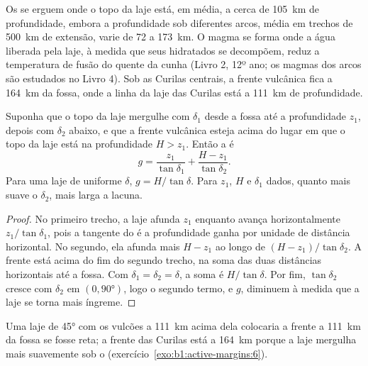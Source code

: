 Os  se erguem onde o topo da laje está, em média, a cerca de \qty{105}{km} de profundidade, embora a profundidade sob diferentes arcos, média em trechos de \qty{500}{km} de extensão, varie de 72 a \qty{173}{km}. O magma se forma onde a água liberada pela laje, à medida que seus  hidratados se decompõem, reduz a temperatura de fusão do  quente da cunha (Livro 2, 12º ano; os magmas dos arcos são estudados no Livro 4). Sob as Curilas centrais, a frente vulcânica fica a \qty{164}{km} da fossa, onde a linha da laje das Curilas está a \qty{111}{km} de profundidade.

\begin{proposition}\label{prop:b1:active-margins:gap}
Suponha que o topo da laje mergulhe com $\delta_1$ desde a fossa até a profundidade $z_1$, depois com $\delta_2$ abaixo, e que a frente vulcânica esteja acima do lugar em que o topo da laje está na profundidade $H > z_1$. Então a  é
\[
  g = \frac{z_1}{\tan\delta_1} + \frac{H - z_1}{\tan\delta_2} .
\]
Para uma laje de  uniforme $\delta$, $g = H/\tan\delta$. Para $z_1$, $H$ e $\delta_1$ dados, quanto mais suave o  $\delta_2$, mais larga a lacuna.
\end{proposition}

\begin{proof}
No primeiro trecho, a laje afunda $z_1$ enquanto avança horizontalmente
$z_1/\tan\delta_1$, pois a tangente do  é a profundidade ganha por unidade de distância horizontal. No segundo, ela afunda mais $H - z_1$ ao longo de
$(H - z_1)/\tan\delta_2$. A frente está acima do fim do segundo trecho, na soma das duas distâncias horizontais até a fossa. Com $\delta_1 = \delta_2
= \delta$, a soma é $H/\tan\delta$. Por fim, $\tan\delta_2$ cresce com $\delta_2$ em $(0, \ang{90})$, logo o segundo termo, e $g$, diminuem à medida que a laje se torna mais íngreme.
\end{proof}

Uma laje de \ang{45} com os vulcões a \qty{111}{km} acima dela colocaria a frente a \qty{111}{km} da fossa se fosse reta; a frente das Curilas está a \qty{164}{km} porque a laje mergulha mais suavemente sob o  (exercício~\ref{exo:b1:active-margins:6}).

